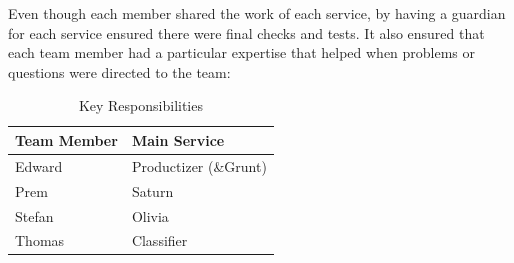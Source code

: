 Even though each member shared the work of each service, by having a guardian for each service ensured there were final checks and tests. It also ensured that each team member had a particular expertise that helped when problems or questions were directed to the team: 

\begin{table}[H]
\centering
\begin{tabular}{@{}ll@{}}
\toprule
Team Member & Main Service          \\ \midrule
Edward      & Productizer (\&Grunt) \\
Prem        & Saturn                \\
Stefan      & Olivia                \\
Thomas      & Classifier            \\ \bottomrule
\end{tabular}
\caption{Key Responsibilities}
\end{table}


